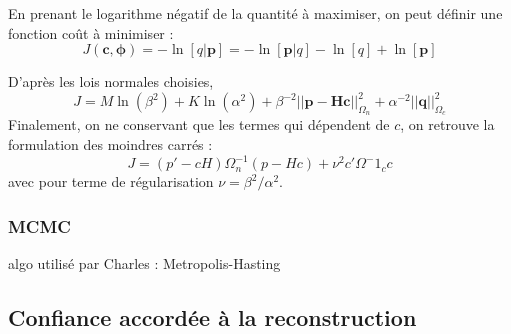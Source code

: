 En prenant le logarithme négatif de la quantité à maximiser, on peut définir une fonction coût à minimiser : 
\begin{equation}
	J(\bm{c},\bm{\phi}) = - \ln[q|\bm{p}] = -\ln[\bm{p}|q]-\ln[q]+\ln[\bm{p}]
\end{equation}

D'après les lois normales choisies, 
\begin{equation}
J=M\ln(\beta^2) + K\ln(\alpha^2) +\beta^{-2}||\bm{p}-\bm{Hc}||^2_{\Omega_n}+\alpha^{-2}||\bm{q}||^2_{\Omega_c}
\end{equation}
Finalement, on ne conservant que les termes qui dépendent de $c$, on retrouve la formulation des moindres carrés : 
\begin{equation}
 J = (p'-cH)\Omega^{-1}_n(p-Hc) + \nu^2c'\Omega^-1_c c
\end{equation}
avec pour terme de régularisation $\nu = \beta^2/\alpha^2$.





\subsubsection{MCMC}
algo utilisé par Charles : Metropolis-Hasting


\subsection{Confiance accordée à la reconstruction}

	
